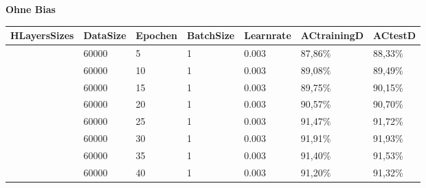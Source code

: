 \documentclass[12pt]{article}
\begin{document}
\begin{table}[H]
    \textbf{Ohne Bias}
    \centering
    \begin{tabular}{|l|l|l|l|l|l|l|}
    \hline
        HLayersSizes & DataSize & Epochen & BatchSize & Learnrate & ACtrainingD & ACtestD \\ \hline
        [784, 100, 10] & 60000 & 5 & 1 & 0.003 & 87,86\% & 88,33\% \\ \hline
        [784, 100, 10] & 60000 & 10 & 1 & 0.003 & 89,08\% & 89,49\% \\ \hline
        [784, 100, 10] & 60000 & 15 & 1 & 0.003 & 89,75\% & 90,15\% \\ \hline
        [784, 100, 10] & 60000 & 20 & 1 & 0.003 & 90,57\% & 90,70\% \\ \hline
        [784, 100, 10] & 60000 & 25 & 1 & 0.003 & 91,47\% & 91,72\% \\ \hline
        [784, 100, 10] & 60000 & 30 & 1 & 0.003 & 91,91\% & 91,93\% \\ \hline
        [784, 100, 10] & 60000 & 35 & 1 & 0.003 & 91,40\% & 91,53\% \\ \hline
        [784, 100, 10] & 60000 & 40 & 1 & 0.003 & 91,20\% & 91,32\% \\ \hline
    \end{tabular}
\end{table}
\end{document}
